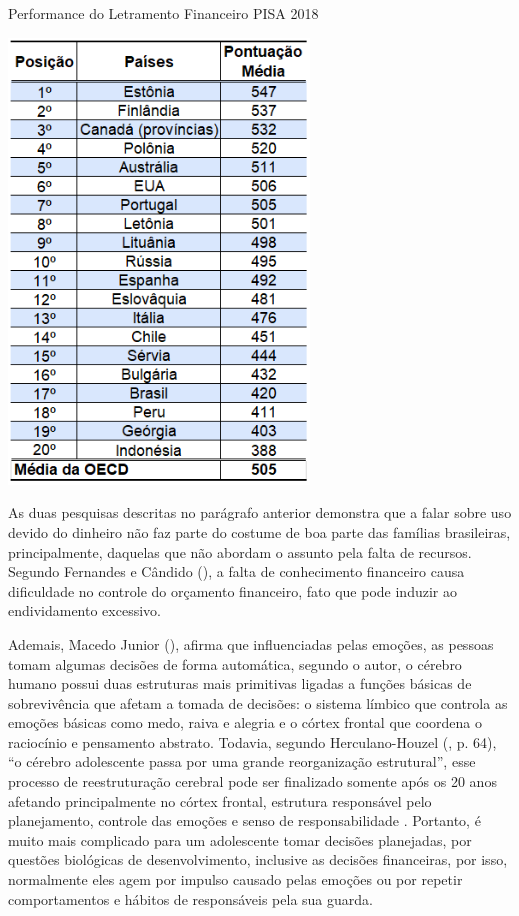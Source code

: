 \graphicspath{{tabelas/}}
\begin{table}[!ht]
\centering
\begin{minipage}{0.65\textwidth}
\caption{Performance do Letramento Financeiro PISA 2018}
\centering
\includegraphics[width=0.6\textwidth]{tabela01-pisa2018}
\label{tab:tabela01-pisa2018}
\end{minipage}
\end{table}

\newpage
As duas pesquisas descritas no parágrafo anterior demonstra que a falar sobre uso devido do dinheiro não faz parte do costume de boa parte das famílias brasileiras, principalmente, daquelas que não abordam o assunto pela falta de recursos. Segundo Fernandes e Cândido (\citeyear{fernandes-candido2014}), a falta de conhecimento financeiro causa dificuldade no controle do orçamento financeiro, fato que pode induzir ao endividamento excessivo.

Ademais, Macedo Junior (\citeyear{macedo2013}), afirma que influenciadas pelas emoções, as pessoas tomam algumas decisões de forma automática, segundo o autor, o cérebro humano possui duas estruturas mais primitivas ligadas a funções básicas de sobrevivência que afetam a tomada de decisões: o sistema límbico que controla as emoções básicas como medo, raiva e alegria e o córtex frontal que coordena o raciocínio e pensamento abstrato. Todavia, segundo Herculano-Houzel (\citeyear{herculano2005}, p. 64), “o cérebro adolescente passa por uma grande reorganização estrutural”, esse processo de reestruturação cerebral pode ser finalizado somente após os 20 anos afetando principalmente no córtex frontal, estrutura responsável pelo planejamento, controle das emoções e senso de responsabilidade \cite{konkiewitz2013}. Portanto, é muito mais complicado para um adolescente tomar decisões planejadas, por questões biológicas de desenvolvimento, inclusive as decisões financeiras, por isso, normalmente eles agem por impulso causado pelas emoções ou por repetir comportamentos e hábitos de responsáveis pela sua guarda.

